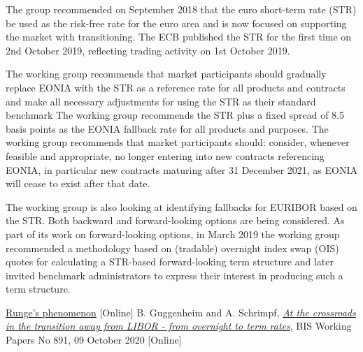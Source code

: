 The group recommended on September 2018 that the euro
short-term rate (STR) be used as the risk-free rate for the euro area
and is now focused on supporting the market with transitioning.
The ECB published the STR for the first time on 2nd October 2019,
reflecting trading activity on 1st October 2019.

The working group recommends that market participants should gradually replace
EONIA with the STR as a reference rate for all products and
contracts and make all necessary adjustments for using the STR as
their standard benchmark
The working group recommends the STR plus a fixed spread of 8.5
basis points as the EONIA fallback rate for all products and purposes.
The working group recommends that market participants should:
consider, whenever feasible and appropriate, no longer entering into
new contracts referencing EONIA, in particular new contracts
maturing after 31 December 2021, as EONIA will cease to exist after
that date.

The working group is also looking at identifying fallbacks for
EURIBOR based on the STR. Both backward and forward-looking
options are being considered. As part of its work on forward-looking
options, in March 2019 the working group recommended a
methodology based on (tradable) overnight index swap (OIS) quotes
for calculating a STR-based forward-looking term structure and later
invited benchmark administrators to express their interest in
producing such a term structure.

\begin{thebibliography}{9}
	 \href{https://en.wikipedia.org/wiki/Runge\%27s_phenomenon}{Runge's phenomenon} [Online]
	B. Guggenheim and A. Schrimpf, 
	\href{https://www.bis.org/publ/work891.htm}{\emph{At the crossroads in the transition away from LIBOR - from overnight to term rates}}, BIS Working Papers No 891, 09 October 2020 [Online]
\end{thebibliography}
